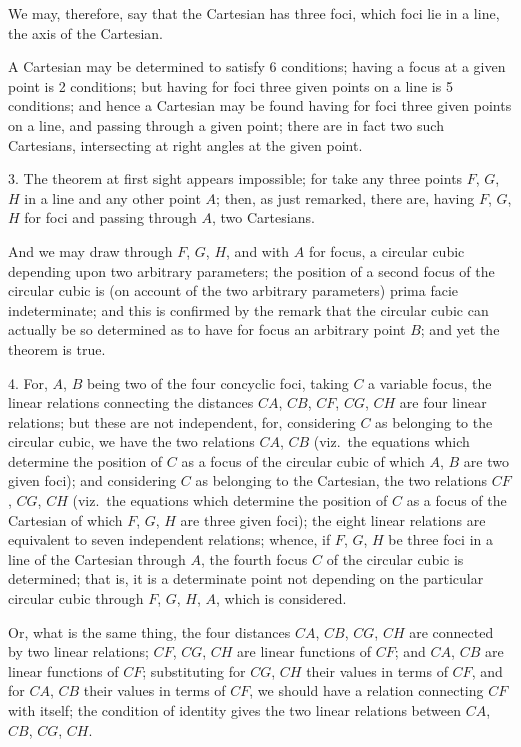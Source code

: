 \documentclass[11pt,a4paper]{article}
\theoremstyle{plain}
\theoremstyle{definition}
\theoremstyle{remark}
\begin{document}
We may, therefore, say that the Cartesian has three foci, which foci lie in a line, the axis of the Cartesian.

A Cartesian may be determined to satisfy 6 conditions; having a focus at a given point is 2 conditions; but having for foci three given points on a line is 5 conditions; and hence a Cartesian may be found having for foci three given points on a line, and passing through a given point; there are in fact two such Cartesians, intersecting at right angles at the given point.

3. The theorem at first sight appears impossible; for take any three points $F$, $G$, $H$ in a line and any other point $A$; then, as just remarked, there are, having $F$, $G$, $H$ for foci and passing through $A$, two Cartesians.

And we may draw through $F$, $G$, $H$, and with $A$ for focus, a circular cubic depending upon two arbitrary parameters; the position of a second focus of the circular cubic is (on account of the two arbitrary parameters) prima facie indeterminate; and this is confirmed by the remark that the circular cubic can actually be so determined as to have for focus an arbitrary point $B$; and yet the theorem is true.

4. For, $A$, $B$ being two of the four concyclic foci, taking $C$ a variable focus, the linear relations connecting the distances $CA$, $CB$, $CF$, $CG$, $CH$ are four linear relations; but these are not independent, for, considering $C$ as belonging to the circular cubic, we have the two relations $CA$, $CB$ (viz.\ the equations which determine the position of $C$ as a focus of the circular cubic of which $A$, $B$ are two given foci); and considering $C$ as belonging to the Cartesian, the two relations $CF$, $CG$, $CH$ (viz.\ the equations which determine the position of $C$ as a focus of the Cartesian of which $F$, $G$, $H$ are three given foci); the eight linear relations are equivalent to seven independent relations; whence, if $F$, $G$, $H$ be three foci in a line of the Cartesian through $A$, the fourth focus $C$ of the circular cubic is determined; that is, it is a determinate point not depending on the particular circular cubic through $F$, $G$, $H$, $A$, which is considered.

Or, what is the same thing, the four distances $CA$, $CB$, $CG$, $CH$ are connected by two linear relations; $CF$, $CG$, $CH$ are linear functions of $CF$; and $CA$, $CB$ are linear functions of $CF$; substituting for $CG$, $CH$ their values in terms of $CF$, and for $CA$, $CB$ their values in terms of $CF$, we should have a relation connecting $CF$ with itself; the condition of identity gives the two linear relations between $CA$, $CB$, $CG$, $CH$.
\end{document}
